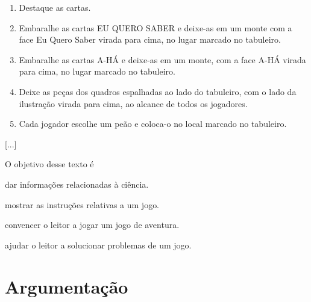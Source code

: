 \begin{enumerate}
\item Destaque as cartas.
\item Embaralhe as cartas EU QUERO SABER e deixe-as em um monte com a
face Eu Quero Saber virada para cima, no lugar marcado no tabuleiro.
\item Embaralhe as cartas A-HÁ e deixe-as em um monte, com a face A-HÁ
virada para cima, no lugar marcado no tabuleiro.
\item Deixe as peças dos quadros espalhadas ao lado do tabuleiro, com o
lado da ilustração virada para cima, ao alcance de todos os jogadores.
\item Cada jogador escolhe um peão e coloca-o no local marcado no
tabuleiro.
\end{enumerate}

{[}...{]}


O objetivo desse texto é

\begin{escolha}
\item dar informações relacionadas à ciência.

\item mostrar as instruções relativas a um jogo.

\item convencer o leitor a jogar um jogo de aventura.

\item ajudar o leitor a solucionar problemas de um jogo.
\end{escolha}

\chapter{Argumentação}



